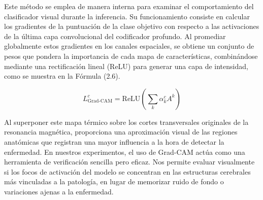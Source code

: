 \documentclass[12pt, oneside, english, spanish]{book}
\begin{document}
\begin{table}[htpb]
	\centering
	\caption[Uso y validación clínica de métodos de explicabilidad.] {Prevalencia de las técnicas de interpretabilidad (XAI) aplicadas en neuroimagen y sus respectivas tasas de contraste clínico o biológico. \textbf{Fuente:}  adaptado de Young et al. (2025) \cite{young2025}.}
	\label{tab:young_interp}
\end{table}

Este método se emplea de manera interna para examinar el comportamiento del clasificador visual durante la inferencia. Su funcionamiento consiste en calcular los gradientes de la puntuación de la clase objetivo con respecto a las activaciones de la última capa convolucional del codificador profundo. Al promediar globalmente estos gradientes en los canales espaciales, se obtiene un conjunto de pesos que pondera la importancia de cada mapa de características, combinándose mediante una rectificación lineal (ReLU) para generar una capa de intensidad, como se muestra en la Fórmula (2.6).

\begin{equation}
	L_{\text{Grad-CAM}}^{c} = \text{ReLU} \left( \sum_{k} \alpha_k^c A^k \right)
\end{equation}

Al superponer este mapa térmico sobre los cortes transversales originales de la resonancia magnética, proporciona una aproximación visual de las regiones anatómicas que registran una mayor influencia a la hora de detectar la enfermedad. En nuestros experimentos, el uso de Grad-CAM actúa como una herramienta de verificación sencilla pero eficaz. Nos permite evaluar visualmente si los focos de activación del modelo se concentran en las estructuras cerebrales más vinculadas a la patología, en lugar de memorizar ruido de fondo o variaciones ajenas a la enfermedad. 
\end{document}
